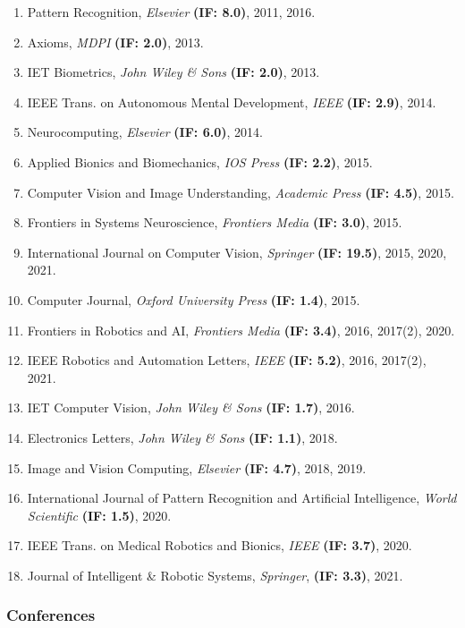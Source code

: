 \begin{enumerate}
\item
  Pattern Recognition, \emph{Elsevier} \textbf{(IF: 8.0)}, 2011, 2016.
\item
  Axioms, \emph{MDPI} \textbf{(IF: 2.0)}, 2013.
\item
  IET Biometrics, \emph{John Wiley \& Sons} \textbf{(IF: 2.0)}, 2013.
\item
  IEEE Trans. on Autonomous Mental Development, \emph{IEEE} \textbf{(IF:
  2.9)}, 2014.
\item
  Neurocomputing, \emph{Elsevier} \textbf{(IF: 6.0)}, 2014.
\item
  Applied Bionics and Biomechanics, \emph{IOS Press} \textbf{(IF: 2.2)},
  2015.
\item
  Computer Vision and Image Understanding, \emph{Academic Press}
  \textbf{(IF: 4.5)}, 2015.
\item
  Frontiers in Systems Neuroscience, \emph{Frontiers Media} \textbf{(IF:
  3.0)}, 2015.
\item
  International Journal on Computer Vision, \emph{Springer} \textbf{(IF:
  19.5)}, 2015, 2020, 2021.
\item
  Computer Journal, \emph{Oxford University Press} \textbf{(IF: 1.4)},
  2015.
\item
  Frontiers in Robotics and AI, \emph{Frontiers Media} \textbf{(IF:
  3.4)}, 2016, 2017(2), 2020.
\item
  IEEE Robotics and Automation Letters, \emph{IEEE} \textbf{(IF: 5.2)},
  2016, 2017(2), 2021.
\item
  IET Computer Vision, \emph{John Wiley \& Sons} \textbf{(IF: 1.7)},
  2016.
\item
  Electronics Letters, \emph{John Wiley \& Sons} \textbf{(IF: 1.1)},
  2018.
\item
  Image and Vision Computing, \emph{Elsevier} \textbf{(IF: 4.7)}, 2018,
  2019.
\item
  International Journal of Pattern Recognition and Artificial
  Intelligence, \emph{World Scientific} \textbf{(IF: 1.5)}, 2020.
\item
  IEEE Trans. on Medical Robotics and Bionics, \emph{IEEE} \textbf{(IF:
  3.7)}, 2020.
\item
  Journal of Intelligent \& Robotic Systems, \emph{Springer},
  \textbf{(IF: 3.3)}, 2021.
\end{enumerate}

\subsubsection{Conferences}\label{conferences}

